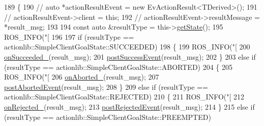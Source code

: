 \begin{DoxyCode}
189     \{
190         \textcolor{comment}{// auto *actionResultEvent = new EvActionResult<TDerived>();}
191         \textcolor{comment}{// actionResultEvent->client = this;}
192         \textcolor{comment}{// actionResultEvent->resultMessage = *result\_msg;}
193 
194         \textcolor{keyword}{const} \textcolor{keyword}{auto} &resultType = this->\hyperlink{classsmacc_1_1SmaccActionClientBase_a7a3edf84a8126dc723f3fc5e082aecf0}{getState}();
195         ROS\_INFO(\textcolor{stringliteral}{"[%
196 
197         \textcolor{keywordflow}{if} (resultType == actionlib::SimpleClientGoalState::SUCCEEDED)
198         \{
199             ROS\_INFO(\textcolor{stringliteral}{"[%
200             \hyperlink{classsmacc_1_1SmaccActionClientBase_aca976e0c55e96165fdc0eb6df7919d58}{onSucceeded\_}(result\_msg);
201             \hyperlink{classsmacc_1_1SmaccActionClientBase_afa4343d33f5c10b54a98c875b5a37b04}{postSuccessEvent}(result\_msg);
202         \}
203         \textcolor{keywordflow}{else} \textcolor{keywordflow}{if} (resultType == actionlib::SimpleClientGoalState::ABORTED)
204         \{
205             ROS\_INFO(\textcolor{stringliteral}{"[%
206             \hyperlink{classsmacc_1_1SmaccActionClientBase_a45a892b990b8d61e4f2f5b34181bf16d}{onAborted\_}(result\_msg);
207             \hyperlink{classsmacc_1_1SmaccActionClientBase_ae0ec1c3fcea9712b35bc09686687c251}{postAbortedEvent}(result\_msg);
208         \}
209         \textcolor{keywordflow}{else} \textcolor{keywordflow}{if} (resultType == actionlib::SimpleClientGoalState::REJECTED)
210         \{
211             ROS\_INFO(\textcolor{stringliteral}{"[%
212             \hyperlink{classsmacc_1_1SmaccActionClientBase_a5c45413657d82e9505537df51b764c41}{onRejected\_}(result\_msg);
213             \hyperlink{classsmacc_1_1SmaccActionClientBase_ac6e3851af2c76823d41219efbf2df480}{postRejectedEvent}(result\_msg);
214         \}
215         \textcolor{keywordflow}{else} \textcolor{keywordflow}{if} (resultType == actionlib::SimpleClientGoalState::PREEMPTED)
}}}}
\end{DoxyCode}

